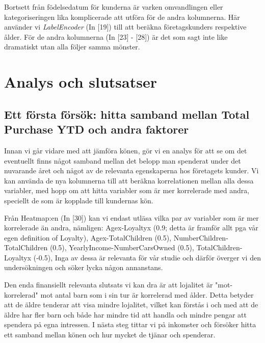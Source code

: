 \documentclass[10pt]{article}
\begin{document}
Bortsett från födelsedatum för kunderna är varken omvandlingen eller kategoriseringen lika komplicerade att utföra för de andra kolumnerna. Här använder vi \emph{LabelEncoder}  (In [19]) till att beräkna företagskunders respektive ålder. För de andra kolumnerna (In [23] - [28]) är det som sagt inte like dramatiskt utan alla följer samma mönster.

\section{Analys och slutsatser}

\subsection{Ett första försök: hitta samband mellan Total Purchase YTD och andra faktorer}

Innan vi går vidare med att jämföra könen, gör vi en analys för att se om det eventuellt finns något samband mellan det belopp man spenderat under det nuvarande året och något av de relevanta egenskaperna hos företagets kunder. Vi kan använda de nya kolumnerna till att beräkna korrelationen mellan alla dessa variabler, med hopp om att hitta variabler som är mer korrelerade med andra, speciellt de som är kopplade till kundernas kön.

Från Heatmap:en (In [30]) kan vi endast utläsa vilka par av variabler som är mer korrelerade än andra, nämligen: Agex-Loyaltyx (0.9; detta är framför allt pga vår egen definition of Loyalty), Agex-TotalChildren (0.5), NumberChildren-TotalChildren (0.5), YearlyIncome-NumberCarsOwned (0.5), TotalChildren-Loyaltyx (-0.5), Inga av dessa är relevanta för vår studie och därför överger vi den undersökningen och söker lycka någon annanstans.

Den enda finansiellt relevanta slutsats vi kan dra är att lojalitet är "mot-korrelerad" mot antal barn som i sin tur är korrelerad med ålder. Detta betyder att de äldre tenderar att visa mindre lojalitet, vilket kan förstås i och med att de äldre har fler barn och både har mindre tid att handla och mindre pengar att spendera på egna intressen. I nästa steg tittar vi på inkomster och försöker hitta ett samband mellan könen och hur mycket de tjänar och spenderar.
\end{document}
